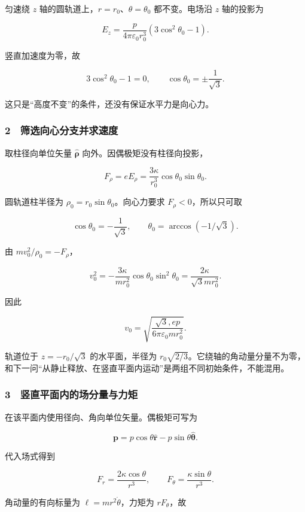 \documentclass[12pt,a4paper,fontset=fandol]{ctexart}
\begin{document}
匀速绕 \(z\) 轴的圆轨道上，\(r=r_0\)、\(\theta=\theta_0\) 都不变。电场沿
\(z\) 轴的投影为

\[E_z=\frac p{4\pi\varepsilon_0r_0^3}
(3\cos^2\theta_0-1).\]

竖直加速度为零，故

\[3\cos^2\theta_0-1=0,\qquad
\cos\theta_0=\pm\frac1{\sqrt3}.\]

这只是``高度不变''的条件，还没有保证水平力是向心力。

\subsubsection{2　筛选向心分支并求速度}\label{ux7b5bux9009ux5411ux5fc3ux5206ux652fux5e76ux6c42ux901fux5ea6}

取柱径向单位矢量 \(\hat{\boldsymbol\rho}\)
向外。因偶极矩没有柱径向投影，

\[F_\rho=eE_\rho=
\frac{3\kappa}{r_0^3}\cos\theta_0\sin\theta_0.\]

圆轨道柱半径为 \(\rho_0=r_0\sin\theta_0\)。向心力要求
\(F_\rho<0\)，所以只可取

\[\boxed{\cos\theta_0=-\frac1{\sqrt3},\qquad
\theta_0=\arccos(-1/\sqrt3).}\]

由 \(m v_0^2/\rho_0=-F_\rho\)，

\[v_0^2=-\frac{3\kappa}{mr_0^2}
\cos\theta_0\sin^2\theta_0
=\frac{2\kappa}{\sqrt3mr_0^2}.\]

因此

\[\boxed{v_0=\sqrt{\frac{\sqrt3,ep}{6\pi\varepsilon_0mr_0^2}}.}\]

轨道位于 \(z=-r_0/\sqrt3\) 的水平面，半径为
\(r_0\sqrt{2/3}\)。它绕轴的角动量分量不为零，和下一问``从静止释放、在竖直平面内运动''是两组不同初始条件，不能混用。

\subsubsection{3　竖直平面内的场分量与力矩}\label{ux7ad6ux76f4ux5e73ux9762ux5185ux7684ux573aux5206ux91cfux4e0eux529bux77e9}

在该平面内使用径向、角向单位矢量。偶极矩可写为

\[\boldsymbol p=p\cos\theta\hat{\boldsymbol r}
-p\sin\theta\hat{\boldsymbol\theta}.\]

代入场式得到

\[F_r=\frac{2\kappa\cos\theta}{r^3},\qquad
F_\theta=\frac{\kappa\sin\theta}{r^3}.\]

角动量的有向标量为 \(\ell=mr^2\dot\theta\)，力矩为 \(rF_\theta\)，故
\end{document}
